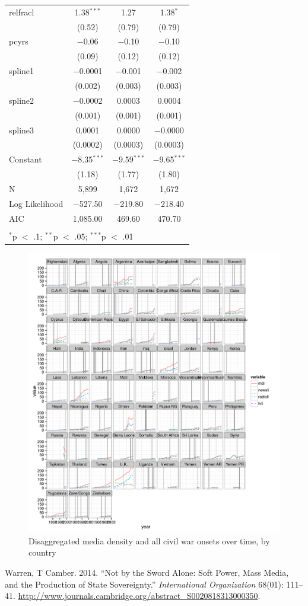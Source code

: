 \documentclass[11pt,article,oneside]{memoir}
\makeatletter
\def\maxwidth{\ifdim\Gin@nat@width>\linewidth\linewidth
\else\Gin@nat@width\fi}
\let\Oldincludegraphics\includegraphics
\renewcommand{\includegraphics}[1]{\Oldincludegraphics[width=\maxwidth]{#1}}
\makeatother
\begin{document}
\begin{table}[!htbp]
\begin{tabular}{@{\extracolsep{5pt}}lccc}
  relfracl & 1.38$^{***}$ & 1.27 & 1.38$^{*}$ \\ 
  & (0.52) & (0.79) & (0.79) \\ 
  pcyrs & $-$0.06 & $-$0.10 & $-$0.10 \\ 
  & (0.09) & (0.12) & (0.12) \\ 
  spline1 & $-$0.0001 & $-$0.001 & $-$0.002 \\ 
  & (0.002) & (0.003) & (0.003) \\ 
  spline2 & $-$0.0002 & 0.0003 & 0.0004 \\ 
  & (0.001) & (0.001) & (0.001) \\ 
  spline3 & 0.0001 & 0.0000 & $-$0.0000 \\ 
  & (0.0002) & (0.0003) & (0.0003) \\ 
  Constant & $-$8.35$^{***}$ & $-$9.59$^{***}$ & $-$9.65$^{***}$ \\ 
  & (1.18) & (1.77) & (1.80) \\ 
 N & 5,899 & 1,672 & 1,672 \\ 
Log Likelihood & $-$527.50 & $-$219.80 & $-$218.40 \\ 
AIC & 1,085.00 & 469.60 & 470.70 \\ 
\hline \\[-1.8ex] 
\multicolumn{4}{l}{$^{*}$p $<$ .1; $^{**}$p $<$ .05; $^{***}$p $<$ .01} \\ 
\end{tabular} 
\end{table}

\begin{figure}[htbp]
\centering
\includegraphics{figure/full_panel_plot.pdf}
\caption{Disaggregated media density and all civil war onsets over time,
by country}
\end{figure}

Warren, T Camber. 2014. ``Not by the Sword Alone: Soft Power, Mass
Media, and the Production of State Sovereignty.'' \emph{International
Organization} 68(01): 111--41.
\url{http://www.journals.cambridge.org/abstract_S0020818313000350}.
\end{document}
